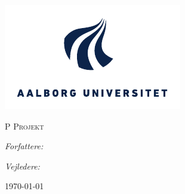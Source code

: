 
\begin{titlepage}
  \centering

  \includegraphics[width=\textwidth]{fig/img/aau-logo.pdf}
  
  \textsc{\LARGE P\projectsemester{} Projekt}\\
  \textsc{\Large \projectdegree}

  \vspace{2cm}

  {\Huge\bfseries\projecttitle}
  
  \vspace{0.5cm}

  {\Large\bfseries\sffamily\projectsubtitle}
    
  \vspace{2cm}

  \begin{minipage}[t]{0.4\textwidth}
    \begin{flushleft}
      \large
      \emph{Forfattere:}\\
      \projectauthors
    \end{flushleft}
  \end{minipage}
  \begin{minipage}[t]{0.4\textwidth}
    \begin{flushright}
      \large
      \emph{Vejledere:}\\
      \projectsupervisors
    \end{flushright}
  \end{minipage}

  \vfill

  {\large\today}
\end{titlepage}